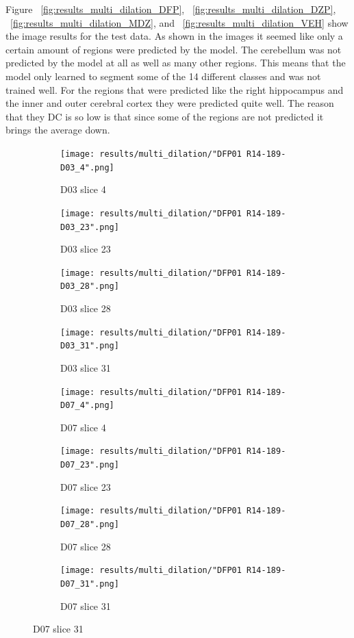 Figure ~\ref{fig:results_multi_dilation_DFP}, ~\ref{fig:results_multi_dilation_DZP}, ~\ref{fig:results_multi_dilation_MDZ}, and ~\ref{fig:results_multi_dilation_VEH} show the image results for the test data.
As shown in the images it seemed like only a certain amount of regions were predicted by the model. 
The cerebellum was not predicted by the model at all as well as many other regions. 
This means that the model only learned to segment some of the 14 different classes and was not trained well.
For the regions that were predicted like the right hippocampus and the inner and outer cerebral cortex they were predicted quite well. 
The reason that they DC is so low is that since some of the regions are not predicted it brings the average down.



\begin{figure}[!htb]  
    \centering %
\begin{subfigure}{0.25\textwidth}
  \texttt{[image: results/multi\_dilation/"DFP01 R14-189-D03\_4".png]}
  \caption{D03 slice 4} 
\end{subfigure}\hfil %
\begin{subfigure}{0.25\textwidth}
  \texttt{[image: results/multi\_dilation/"DFP01 R14-189-D03\_23".png]}
  \caption{D03 slice 23}
\end{subfigure}\hfil %
\begin{subfigure}{0.25\textwidth}
  \texttt{[image: results/multi\_dilation/"DFP01 R14-189-D03\_28".png]}
  \caption{D03 slice 28}
\end{subfigure}\hfil %
\begin{subfigure}{0.25\textwidth}
  \texttt{[image: results/multi\_dilation/"DFP01 R14-189-D03\_31".png]}
  \caption{D03 slice 31}
\end{subfigure}


\medskip
\begin{subfigure}{0.25\textwidth}
  \texttt{[image: results/multi\_dilation/"DFP01 R14-189-D07\_4".png]}
  \caption{D07 slice 4}
\end{subfigure}\hfil %
\begin{subfigure}{0.25\textwidth}
  \texttt{[image: results/multi\_dilation/"DFP01 R14-189-D07\_23".png]}
  \caption{D07 slice 23}
\end{subfigure}\hfil %
\begin{subfigure}{0.25\textwidth}
  \texttt{[image: results/multi\_dilation/"DFP01 R14-189-D07\_28".png]}
  \caption{D07 slice 28}
\end{subfigure}\hfil %
\begin{subfigure}{0.25\textwidth}
  \texttt{[image: results/multi\_dilation/"DFP01 R14-189-D07\_31".png]}
  \caption{D07 slice 31}
\end{subfigure}



\end{figure}
